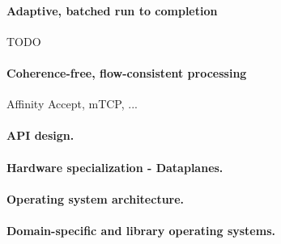 \paragraph{Adaptive, batched run to completion}

\todo TODO

\paragraph{Coherence-free, flow-consistent processing}

\todo Affinity Accept, mTCP, ...



\paragraph{API design.}


\paragraph{Hardware specialization - Dataplanes.}

\paragraph{Operating system architecture.}

\paragraph{Domain-specific and library operating systems.}




